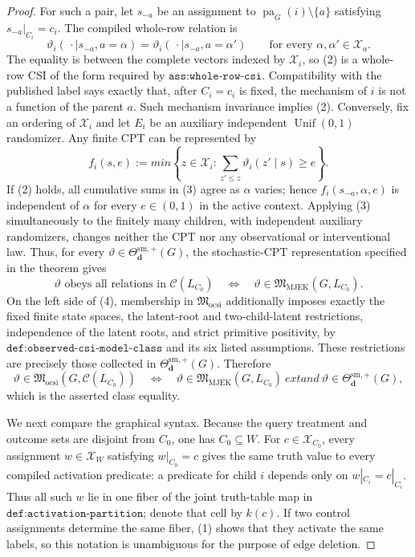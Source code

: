 \documentclass{article}
\begin{document}
\begin{proof}
For such a pair, let \(s_{-a}\) be an assignment to \(\operatorname{pa}_G(i)\setminus\{a\}\) satisfying \(s_{-a}|_{C_i}=c_i\).  The compiled whole-row relation is
\[
\vartheta_i(\,\cdot\mid s_{-a},a=\alpha)
=
\vartheta_i(\,\cdot\mid s_{-a},a=\alpha')
\qquad
\text{for every }\alpha,\alpha'\in\mathcal X_a.
\tag{2}
\]
The equality is between the complete vectors indexed by \(\mathcal X_i\), so (2) is a whole-row CSI of the form required by \(\texttt{ass:whole-row-csi}\).  Compatibility with the published label says exactly that, after \(C_i=c_i\) is fixed, the mechanism of \(i\) is not a function of the parent \(a\).  Such mechanism invariance implies (2).  Conversely, fix an ordering of \(\mathcal X_i\) and let \(E_i\) be an auxiliary independent \(\operatorname{Unif}(0,1)\) randomizer.  Any finite CPT can be represented by
\[
f_i(s,e):=min\left\{z\in\mathcal X_i:
  \sum_{z'\le z}\vartheta_i(z'\mid s)\ge e\right\}.
\tag{3}
\]
If (2) holds, all cumulative sums in (3) agree as \(\alpha\) varies; hence \(f_i(s_{-a},\alpha,e)\) is independent of \(\alpha\) for every \(e\in(0,1)\) in the active context.  Applying (3) simultaneously to the finitely many children, with independent auxiliary randomizers, changes neither the CPT nor any observational or interventional law.  Thus, for every \(\vartheta\in\Theta^{\mathrm{sm},+}_{\mathbf d}(G)\), the stochastic-CPT representation specified in the theorem gives
\[
\vartheta\text{ obeys all relations in }\mathcal C(L_{C_0})
\quad\Longleftrightarrow\quad
\vartheta\in\mathfrak M_{\mathrm{MJEK}}(G,L_{C_0}).
\tag{4}
\]
On the left side of (4), membership in \(\mathfrak M_{\mathrm{ocsi}}\) additionally imposes exactly the fixed finite state spaces, the latent-root and two-child-latent restrictions, independence of the latent roots, and strict primitive positivity, by \(\texttt{def:observed-csi-model-class}\) and its six listed assumptions.  These restrictions are precisely those collected in \(\Theta^{\mathrm{sm},+}_{\mathbf d}(G)\).  Therefore
\[
\vartheta\in
\mathfrak M_{\mathrm{ocsi}}\!\left(G,\mathcal C(L_{C_0})\right)
\quad\Longleftrightarrow\quad
\vartheta\in\mathfrak M_{\mathrm{MJEK}}(G,L_{C_0})
\   ext{and}\ 
\vartheta\in\Theta^{\mathrm{sm},+}_{\mathbf d}(G),
\tag{5}
\]
which is the asserted class equality.

We next compare the graphical syntax.  Because the query treatment and outcome sets are disjoint from \(C_0\), one has \(C_0\subseteq W\).  For \(c\in\mathcal X_{C_0}\), every assignment \(w\in\mathcal X_W\) satisfying \(w|_{C_0}=c\) gives the same truth value to every compiled activation predicate: a predicate for child \(i\) depends only on \(w|_{C_i}=c|_{C_i}\).  Thus all such \(w\) lie in one fiber of the joint truth-table map in \(\texttt{def:activation-partition}\); denote that cell by \(k(c)\).  If two control assignments determine the same fiber, (1) shows that they activate the same labels, so this notation is unambiguous for the purpose of edge deletion.


\end{proof}
\end{document}
